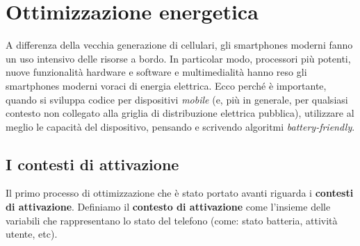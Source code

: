 \documentclass[a4paper,10pt]{memoir}
\begin{document}
\begin{figure}[ht]

\end{figure}

\chapter{Ottimizzazione energetica}

A differenza della vecchia generazione di cellulari, gli smartphones moderni fanno un uso intensivo delle risorse a bordo. In particolar modo, processori più potenti, nuove funzionalità hardware e software e multimedialità hanno reso gli smartphones moderni voraci di energia elettrica. Ecco perché è importante, quando si sviluppa codice per dispositivi \textit{mobile} (e, più in generale, per qualsiasi contesto non collegato alla griglia di distribuzione elettrica pubblica), utilizzare al meglio le capacità del dispositivo, pensando e scrivendo algoritmi \textit{battery-friendly}.

\section{I contesti di attivazione}
\label{section:contesti}

Il primo processo di ottimizzazione che è stato portato avanti riguarda i \textbf{contesti di attivazione}. Definiamo il \textbf{contesto di attivazione} come l'insieme delle variabili che rappresentano lo stato del telefono (come: stato batteria, attività utente, etc).
\end{document}
